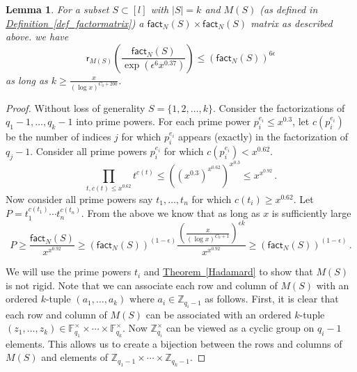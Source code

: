 \documentclass[11pt]{article}
\numberwithin{equation}{section}
\newtheorem{lemma}[theorem]{Lemma}
\theoremstyle{definition}
\theoremstyle{plain}
\newcommand{\Z}{\mathbb Z}
\newcommand{\expref}[2]{\hyperref[#2]{#1~\ref{#2}}}
\theoremstyle{definition}
\newcommand\F{{\mathbb{F}}}
\renewcommand\Z{{\mathbb{Z}}}
\renewcommand\fact{\textsf{fact}}
\begin{document}
\begin{lemma}\label{blockrigidity}
For a subset $S \subset [l]$ with $|S| = k$ and $M(S)$ (as defined in \expref{Definition}{def_factormatrix})  a  $\fact_N(S) \times \fact_N(S)$ matrix as described above.  we have 
\[
\textsf{r}_{M(S)}\left( \frac{\fact_N(S)}{\exp\left(\epsilon^6 x^{0.37}\right)} \right) \leq \left(\fact_N(S)\right)^{6 \epsilon}
\]
as long as $k \geq \frac{x}{(\log x)^{C_0 + 200}}$.
\end{lemma}
\begin{proof}
Without loss of generality $S = \{1,2, \dots , k \}$.  Consider the factorizations of $q_1-1, \dots , q_k-1$ into prime powers.  For each prime power $p_i^{e_i} \leq x^{0.3}$, let $c(p_i^{e_i})$ be the number of indices $j$ for which $p_i^{e_i}$ appears (exactly) in the factorization of $q_j-1$.  Consider all prime powers $p_i^{e_i}$ for which $c(p_i^{e_i}) < x^{0.62}$.
\[
 \prod_{t, c(t) \leq x^{0.62}} t^{c(t)} \leq \left((x^{0.3})^{x^{0.62}} \right)^{x^{0.3}} \leq x^{x^{0.92}} \,.
\]
Now consider all prime powers say $t_1, \dots , t_n$ for which $c(t_i) \geq x^{0.62}$.  Let $P = t_1^{c(t_1)} \cdots t_n^{c(t_n)}$.  {}From the above we know that as long as $x$ is sufficiently large
 \begin{equation}\label{separateprimepowers}
P \geq \frac{\fact_N(S)}{x^{x^{0.92}} } \geq \left(\fact_N(S)\right)^{(1 - \epsilon)} \frac{\left(\frac{x}{(\log x)^{C_0 + 1}} \right)^{\epsilon k}}{x^{x^{0.92}} } \geq \left(\fact_N(S)\right)^{(1 - \epsilon)} \,.
 \end{equation}

We will use the prime powers $t_i$ and \expref{Theorem}{Hadamard} to show that $M(S)$ is not rigid.  Note that we can associate each row and column of $M(S)$ %
with  %
an ordered $k$-tuple $(a_1, \dots , a_k)$ where $a_i \in \Z_{q_i-1}$ as follows. First, it is clear that each row and column of $M(S)$ can be associated
%
with  %
an ordered $k$-tuple 
%
%
$(z_1, \dots , z_k) \in \F_{q_1}^{\times} \times \cdots \times \F_{q_k}^{\times}$.
Now $\Z_{q_i}^{\times}$ can be viewed as a cyclic group on $q_i-1$ elements.  This allows us to create a bijection between the rows and columns of $M(S)$ and elements of $\Z_{q_1-1} \times \cdots \times \Z_{q_k-1}$.


\end{proof}
\end{document}
